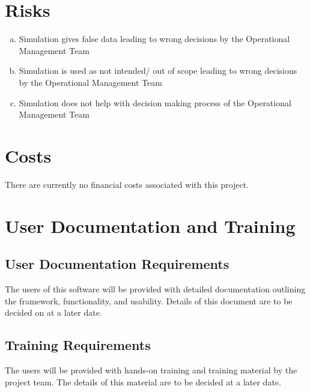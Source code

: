 \documentclass[paper=letter, fontsize=10pt]{scrartcl}
\numberwithin{equation}{section}		%
\numberwithin{figure}{section}			%
\numberwithin{table}{section}				%
\begin{document}
\section{Risks}
\begin{enumerate}[(a)]
	\item Simulation gives false data leading to wrong decisions by the Operational Management Team
	\item Simulation is used as not intended/ out of scope leading to wrong decisions by the Operational Management Team
	\item Simulation does not help with decision making process of the Operational Management Team 
\end{enumerate}
\section{Costs}
There are currently no financial costs associated with this project.

\section{User Documentation and Training}
\subsection{User Documentation Requirements}
The users of this software will be provided with detailed documentation outlining the framework, functionality, and usability. Details of this document are to be decided on at a later date.
\subsection{Training Requirements}
The users will be provided with hands-on training and training material by the project team. The details of this material are to be decided at a later date. 
\end{document}
